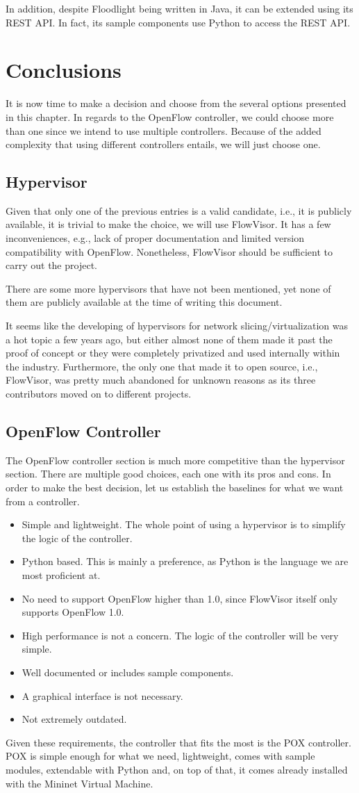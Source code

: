 In addition, despite Floodlight being written in Java, it can be extended using its REST API. In fact, its sample components use Python to access the REST API.

\section{Conclusions}
It is now time to make a decision and choose from the several options presented in this chapter. In regards to the OpenFlow controller, we could choose more than one since we intend to use multiple controllers. Because of the added complexity that using different controllers entails, we will just choose one. 

\subsection{Hypervisor}
Given that only one of the previous entries is a valid candidate, i.e., it is publicly available, it is trivial to make the choice, we will use FlowVisor. It has a few inconveniences, e.g., lack of proper documentation and limited version compatibility with OpenFlow. Nonetheless, FlowVisor should be sufficient to carry out the project.

There are some more hypervisors that have not been mentioned, yet none of them are publicly available at the time of writing this document.

It seems like the developing of hypervisors for network slicing/virtualization was a hot topic a few years ago, but either almost none of them made it past the proof of concept or they were completely privatized and used internally within the industry. Furthermore, the only one that made it to open source, i.e., FlowVisor, was pretty much abandoned for unknown reasons as its three contributors moved on to different projects.

\subsection{OpenFlow Controller}
The OpenFlow controller section is much more competitive than the hypervisor section. There are multiple good choices, each one with its pros and cons. In order to make the best decision, let us establish the baselines for what we want from a controller.
\begin{itemize}
    \item Simple and lightweight. The whole point of using a hypervisor is to simplify the logic of the controller.
    \item Python based. This is mainly a preference, as Python is the language we are most proficient at.
    \item No need to support OpenFlow higher than 1.0, since FlowVisor itself only supports OpenFlow 1.0.
    \item High performance is not a concern. The logic of the controller will be very simple.
    \item Well documented or includes sample components.
    \item A graphical interface is not necessary.
    \item Not extremely outdated.
\end{itemize}

Given these requirements, the controller that fits the most is the POX controller. POX is simple enough for what we need, lightweight, comes with sample modules, extendable with Python and, on top of that, it comes already installed with the Mininet Virtual Machine.
